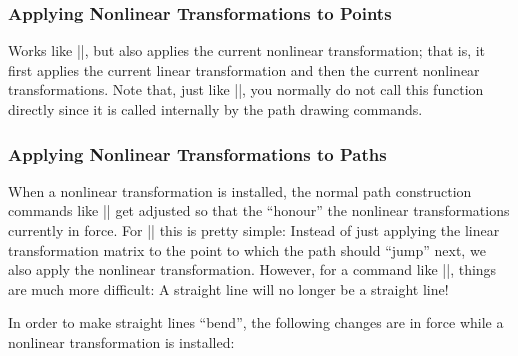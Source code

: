 \subsubsection{Applying Nonlinear Transformations to Points}

\begin{command}{\pgfpointtransformednonlinear{}}
  Works like |\pgfpointtransformed|, but also applies the current
  nonlinear transformation; that is, it first applies the current
  linear transformation and then the current nonlinear
  transformations. Note that, just like |\pgfpointtransformed|, you
  normally do not call this function directly since it is called
  internally by the path drawing commands.
\end{command}


\subsubsection{Applying Nonlinear Transformations to Paths}

When a nonlinear transformation is installed, the normal path
construction commands like |\pgfpathmoveto| get adjusted so that the
``honour'' the nonlinear transformations currently in force. For
|\pgfpathmoveto| this is pretty simple: Instead of just applying the
linear transformation matrix to the point to which the path should
``jump'' next, we also apply the nonlinear transformation. However,
for a command like |\pgfpathlineto|, things are much more difficult:
A straight line will no longer be a straight line!

In order to make straight lines ``bend'', the following changes are in
force while a nonlinear transformation is installed:

